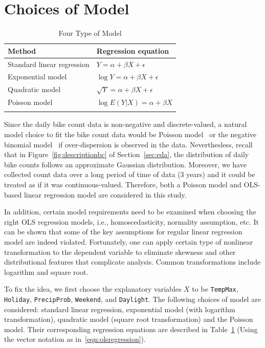 \documentclass [11pt, proquest] {uwthesis}[2015/03/03]
\begin{document}
\section{Choices of Model}
\label{sec:choiceofmodel}

\begin{table}
\begin{center}
\caption{Four Type of Model}
\vspace{10pt}
\begin{tabular}{l|l} 
 \hline
Method & Regression equation \\
\hline
Standard linear regression & $Y=\alpha+\beta X + \epsilon$ \\
Exponential model & $\log{Y} = \alpha + \beta X + \epsilon$ \\
Quadratic model & $\sqrt{Y} = \alpha + \beta X + \epsilon$ \\
Poisson model & $\log{E(Y|X)} = \alpha + \beta X $\\
\label{tbl:choiceofmodel}
\end{tabular}
\end{center}
\end{table}

Since the daily bike count data is non-negative and discrete-valued, a natural model choice to fit the bike count data would be Poisson model~\cite{Niemeier:1996aa} or the negative binomial model~\cite{PeterWeiran16} if over-dispersion is observed in the data. Neverthesless, recall that in Figure~\ref{fig:descriptionbc} of Section~\ref{sec:eda}, the distribution of daily bike counts follows an approximate Gaussian distribution. Moreover, we have collected count data over a long period of time of data (3 years) and it could be treated as if it was continuous-valued. Therefore, both a Poisson model and OLS-based linear regression model are considered in this study.

In addition, certain model requirements need to be examined when choosing the right OLS regression models, i.e., homoscedasticity, normality assumption, etc. It can be shown that some of the key assumptions for regular linear regression model are indeed violated. Fortunately, one can apply certain type of nonlinear transformation to the dependent variable to eliminate skewness and other distributional features that complicate analysis. Common transformations include logarithm and square root.

To fix the idea, we first choose the explanatory variables $X$ to be \texttt{TempMax}, \texttt{Holiday}, \texttt{PrecipProb}, \texttt{Weekend}, and \texttt{Daylight}. The following choices of model are considered: standard linear regression, exponential model (with logarithm transformation), quadratic model (square root transformation) and the Poisson model. Their corresponding regression equations are described in Table~\ref{tbl:choiceofmodel} (Using the vector notation as in~\eqref{eqn:olsregression}).
\end{document}
